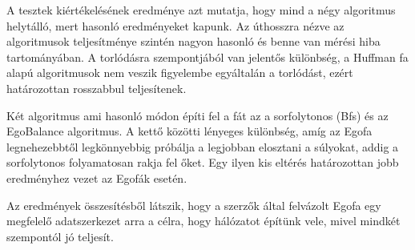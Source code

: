 \documentclass[12pt]{report}
\begin{document}
A tesztek kiértékelésének eredménye azt mutatja, hogy mind a négy algoritmus helytálló, mert hasonló eredményeket kapunk.
Az úthosszra nézve az algoritmusok teljesítménye szintén nagyon hasonló és benne van mérési hiba tartományában.
A torlódásra szempontjából van jelentős különbség, a Huffman fa alapú algoritmusok nem veszik figyelembe egyáltalán a torlódást, ezért határozottan rosszabbul teljesítenek.
 
Két algoritmus ami hasonló módon építi fel a fát az a sorfolytonos (Bfs) és az EgoBalance algoritmus. 
A kettő közötti lényeges különbség, amíg az Egofa legnehezebbtől legkönnyebbig próbálja a legjobban elosztani a súlyokat, addig a sorfolytonos folyamatosan rakja fel őket.
Egy ilyen kis eltérés határozottan jobb eredményhez vezet az Egofák esetén.

Az eredmények összesítésből látszik, hogy a szerzők által felvázolt Egofa egy megfelelő adatszerkezet arra a célra, hogy hálózatot építünk vele, mivel mindkét szempontól jó teljesít.





	
\end{document}
